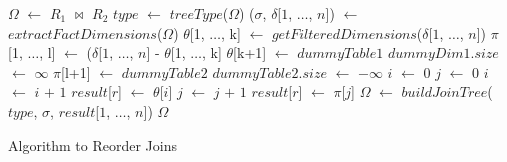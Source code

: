 \begin{algorithm}
\begin{algorithmic}[1]
\STATE  $\Omega$ $\gets$ $R_1$ $\Join$ $R_2$
    \STATE $type$ $\gets$ $treeType$($\Omega$) 
    \STATE ($\sigma$, $\delta$[$1$, $\ldots$, $n$]) $\gets$ $extractFactDimensions$($\Omega$)
    \STATE $\theta$[1, $\ldots$, k] $\gets$ $getFilteredDimensions$($\delta$[$1$, $\ldots$, $n$])
    \STATE $\pi$[1, $\ldots$, l] $\gets$ ($\delta$[$1$, $\ldots$, $n$] - $\theta$[1, $\ldots$, k]
    \STATE $\theta$[k+1] $\gets$ $dummyTable1$
    \STATE $dummyDim1$.$size$ $\gets$ $\infty$
    \STATE $\pi$[l+1] $\gets$ $dummyTable2$
    \STATE $dummyTable2$.$size$ $\gets$ $-\infty$
    \STATE $i$ $\gets$ 0
    \STATE $j$ $\gets$ 0
            \STATE $i$ $\gets$ $i$ $+$ $1$
            \STATE $result$[$r$] $\gets$ $\theta$[$i$]
        \ELSE
            \STATE $j$ $\gets$ $j$ $+$ $1$
            \STATE $result$[$r$] $\gets$ $\pi$[$j$]
        \ENDIF
    \ENDFOR
    \STATE $\Omega$ $\gets$ $buildJoinTree$($type$, $\sigma$, $result$[$1$, $\ldots$, $n$])
\ENDIF
\RETURN $\Omega$
\end{algorithmic}
\label{algorithm}
\caption{Algorithm to Reorder Joins}
\end{algorithm}


